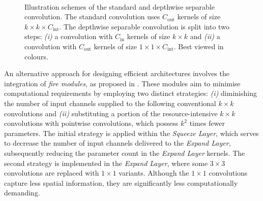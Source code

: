 \begin{figure}[htbp]
\centering
{}\\
    \vspace{1cm}
    \caption{Illustration schemes of the standard and depthwise separable
    convolution. The standard convolution uses $C_\text{out}$ kernels of size
    $k\times k \times C_\text{int}$. The depthwise separable convolution is
    split into two steps: \emph{(i)} a convolution with $C_\text{in}$ kernels
    of size $k \times k$ and \emph{(ii)} a convolution with $C_\text{out}$
    kernels of size $1\times 1 \times C_\text{int}$.
    Best viewed in colours.}
\label{fig:sota:depthwise_conv_vs_standard_conv}
\end{figure}


An alternative approach for designing efficient architectures involves the
integration of \emph{fire modules}, as proposed in
\cite{DBLP:journals/corr/IandolaMAHDK16}. These modules aim to minimise
computational requirements by employing two distinct strategies: \emph{(i)}
diminishing the number of input channels supplied to the following conventional
$k\times k$ convolutions and \emph{(ii)} substituting a portion of the
resource-intensive $k\times k$ convolutions with pointwise convolutions, which
possess $k^2$ times fewer parameters. The initial strategy is applied within the
\emph{Squeeze Layer}, which serves to decrease the number of input channels
delivered to the \emph{Expand Layer}, subsequently reducing the parameter count
in the \emph{Expand Layer} kernels. The second strategy is implemented in the
\emph{Expand Layer}, where some $3\times3$ convolutions are replaced with
$1\times1$ variants. Although the $1\times1$ convolutions capture less spatial
information, they are significantly less computationally demanding.\\

